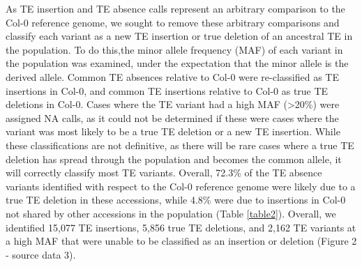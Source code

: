 \documentclass[12pt]{article}
\begin{document}
As TE insertion and TE absence calls represent an arbitrary comparison
to the Col-0 reference genome, we sought to remove these arbitrary
comparisons and classify each variant as a new TE insertion or true
deletion of an ancestral TE in the population. To do this,the minor
allele frequency (MAF) of each variant in the population was examined,
under the expectation that the minor allele is the derived allele.
Common TE absences relative to Col-0 were re-classified as TE
insertions in Col-0, and common TE insertions relative to Col-0 as
true TE deletions in Col-0. Cases where the TE variant had a high MAF
(\textgreater{}20\%) were assigned NA calls, as it could not be
determined if these were cases where the variant was most likely to be
a true TE deletion or a new TE insertion. While these classifications
are not definitive, as there will be rare cases where a true TE
deletion has spread through the population and becomes the common
allele, it will correctly classify most TE variants. Overall, 72.3\%
of the TE absence variants identified with respect to the Col-0
reference genome were likely due to a true TE deletion in these
accessions, while 4.8\% were due to insertions in Col-0 not shared by
other accessions in the population (Table \ref{table2}). Overall, we
identified 15,077 TE insertions, 5,856 true TE deletions, and 2,162 TE
variants at a high MAF that were unable to be classified as an
insertion or deletion (Figure 2 - source data 3).
\end{document}
